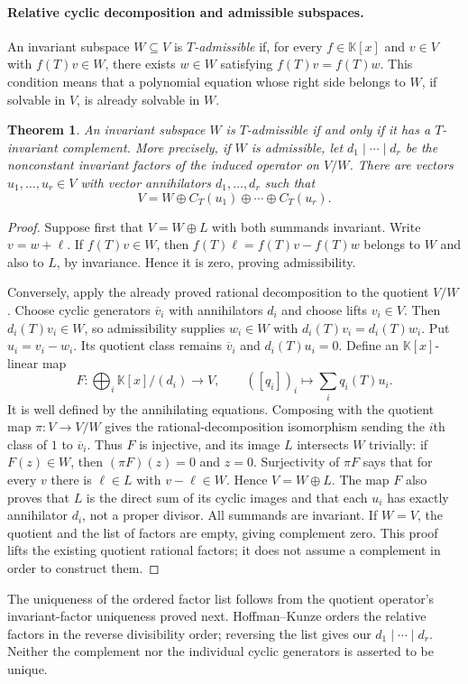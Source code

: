 \documentclass[11pt,a4paper]{book}
\newtheorem{theorem}{Theorem}[chapter]
\theoremstyle{definition}\newtheorem{definition}[theorem]{Definition}
\theoremstyle{remark}\newtheorem{remark}[theorem]{Remark}
\newcommand{\K}{\mathbb K}\newcommand{\R}{\mathbb R}\newcommand{\C}{\mathbb C}
\begin{document}
\paragraph{Relative cyclic decomposition and admissible subspaces.}
An invariant subspace $W\subseteq V$ is \emph{$T$-admissible} if, for every $f\in\K[x]$ and $v\in V$ with $f(T)v\in W$, there exists $w\in W$ satisfying $f(T)v=f(T)w$. This condition means that a polynomial equation whose right side belongs to $W$, if solvable in $V$, is already solvable in $W$.
\begin{theorem}
An invariant subspace $W$ is $T$-admissible if and only if it has a $T$-invariant complement. More precisely, if $W$ is admissible, let $d_1\mid\cdots\mid d_r$ be the nonconstant invariant factors of the induced operator on $V/W$. There are vectors $u_1,\ldots,u_r\in V$ with vector annihilators $d_1,\ldots,d_r$ such that
\[V=W\oplus C_T(u_1)\oplus\cdots\oplus C_T(u_r).
\]
\end{theorem}
\begin{proof}
Suppose first that $V=W\oplus L$ with both summands invariant. Write $v=w+\ell$. If $f(T)v\in W$, then $f(T)\ell=f(T)v-f(T)w$ belongs to $W$ and also to $L$, by invariance. Hence it is zero, proving admissibility.

Conversely, apply the already proved rational decomposition to the quotient $V/W$. Choose cyclic generators $\overline v_i$ with annihilators $d_i$ and choose lifts $v_i\in V$. Then $d_i(T)v_i\in W$, so admissibility supplies $w_i\in W$ with $d_i(T)v_i=d_i(T)w_i$. Put $u_i=v_i-w_i$. Its quotient class remains $\overline v_i$ and $d_i(T)u_i=0$. Define an $\K[x]$-linear map
\[F:\bigoplus_i\K[x]/(d_i)\longrightarrow V,\qquad
([q_i])_i\longmapsto\sum_i q_i(T)u_i.
\]
It is well defined by the annihilating equations. Composing with the quotient map $\pi:V\to V/W$ gives the rational-decomposition isomorphism sending the $i$th class of $1$ to $\overline v_i$. Thus $F$ is injective, and its image $L$ intersects $W$ trivially: if $F(z)\in W$, then $(\pi F)(z)=0$ and $z=0$. Surjectivity of $\pi F$ says that for every $v$ there is $\ell\in L$ with $v-\ell\in W$. Hence $V=W\oplus L$. The map $F$ also proves that $L$ is the direct sum of its cyclic images and that each $u_i$ has exactly annihilator $d_i$, not a proper divisor. All summands are invariant. If $W=V$, the quotient and the list of factors are empty, giving complement zero. This proof lifts the existing quotient rational factors; it does not assume a complement in order to construct them.
\end{proof}
The uniqueness of the ordered factor list follows from the quotient operator's invariant-factor uniqueness proved next. Hoffman--Kunze orders the relative factors in the reverse divisibility order; reversing the list gives our $d_1\mid\cdots\mid d_r$. Neither the complement nor the individual cyclic generators is asserted to be unique.
\end{document}
